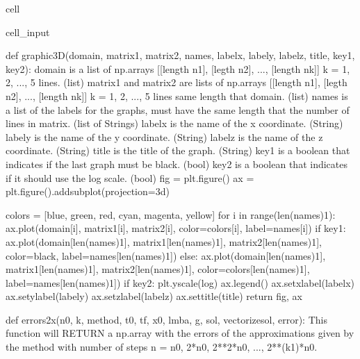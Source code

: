 \documentclass[letterpaper,10pt,english]{jupyterBook}
\begin{document}
\begin{sphinxuseclass}{cell}
\begin{sphinxVerbatimInput}
\begin{sphinxuseclass}{cell_input}
\begin{sphinxVerbatim}[commandchars=\\\{\}]
def graphic\PYGZus{}3D(domain, matrix1, matrix2, names, labelx, labely, labelz, title, key1, key2):
  \PYGZsq{}\PYGZsq{}\PYGZsq{}
  domain is a list of np.arrays [[length n1], [legth n2], ..., [length nk]]
  k = 1, 2, ..., 5 lines. (list)
  matrix1 and matrix2 are lists of np.arrays [[length n1], [legth n2], ..., [length nk]]
  k = 1, 2, ..., 5 lines \PYGZhy{} same length that domain. (list)
  names is a list of the labels for the graphs, must have the same length that
  the number of lines in matrix. (list of Strings)
  labelx is the name of the x coordinate. (String)
  labely is the name of the y coordinate. (String)
  labelz is the name of the z coordinate. (String)
  title is the title of the graph. (String)
  key1 is a boolean that indicates if the last graph must be black. (bool)
  key2 is a boolean that indicates if it should use the log scale. (bool)
  \PYGZsq{}\PYGZsq{}\PYGZsq{}
  fig = plt.figure()
  ax = plt.figure().add\PYGZus{}subplot(projection=\PYGZsq{}3d\PYGZsq{})

  colors = [\PYGZsq{}blue\PYGZsq{}, \PYGZsq{}green\PYGZsq{}, \PYGZsq{}red\PYGZsq{}, \PYGZsq{}cyan\PYGZsq{}, \PYGZsq{}magenta\PYGZsq{}, \PYGZsq{}yellow\PYGZsq{}]
  for i in range(len(names)\PYGZhy{}1):
    ax.plot(domain[i], matrix1[i], matrix2[i], color=colors[i], label=names[i])
  if key1:
    ax.plot(domain[len(names)\PYGZhy{}1], matrix1[len(names)\PYGZhy{}1], matrix2[len(names)\PYGZhy{}1], color=\PYGZsq{}black\PYGZsq{}, label=names[len(names)\PYGZhy{}1])
  else:
    ax.plot(domain[len(names)\PYGZhy{}1], matrix1[len(names)\PYGZhy{}1], matrix2[len(names)\PYGZhy{}1], color=colors[len(names)\PYGZhy{}1], label=names[len(names)\PYGZhy{}1])
  if key2:
    plt.yscale(\PYGZsq{}log\PYGZsq{})
  ax.legend()
  ax.set\PYGZus{}xlabel(labelx)
  ax.set\PYGZus{}ylabel(labely)
  ax.set\PYGZus{}zlabel(labelz)
  ax.set\PYGZus{}title(title)
  return fig, ax

def errors\PYGZus{}2x(n0, k, method, t0, tf, x0, lmba, g, sol, vectorize\PYGZus{}sol, error):
  \PYGZsq{}\PYGZsq{}\PYGZsq{}
  This function will RETURN a np.array with the errors of the approximations given
  by the method with number of steps n = n0, 2*n0, 2**2*n0, ..., 2**(k\PYGZhy{}1)*n0.


\end{sphinxVerbatim}
\end{sphinxuseclass}
\end{sphinxVerbatimInput}
\end{sphinxuseclass}
\end{document}
